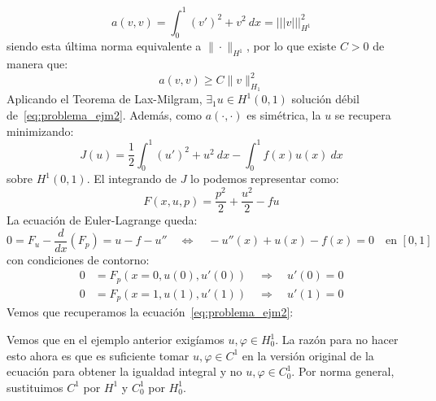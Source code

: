 \begin{ejemplo}
\begin{equation*}
        a(v,v) = \int_{0}^{1} {(v')}^{2}+v^2~dx = \lvert\!\lvert\!\lvert v\rvert\!\rvert\!\rvert_{H^1}^2
    \end{equation*}
    siendo esta última norma equivalente a $\|\cdot \|_{H^1}$, por lo que existe $C>0$ de manera que:
    \begin{equation*}
        a(v,v) \geq C\|v\|^2_{H_1}
    \end{equation*}
    Aplicando el Teorema de Lax-Milgram, $\exists_1 u\in H^1(0,1)$ solución débil de~\eqref{eq:problema_ejm2}. Además, como $a(\cdot ,\cdot )$ es simétrica, la $u$ se recupera minimizando:
    \begin{equation*}
        J(u) = \frac{1}{2}\int_{0}^{1} {(u')}^{2}+u^2~dx  - \int_{0}^{1} f(x)u(x)~dx 
    \end{equation*}
    sobre $H^1(0,1)$. El integrando de $J$ lo podemos representar como:
    \begin{equation*}
        F(x,u,p) = \frac{p^2}{2} + \frac{u^2}{2} - fu
    \end{equation*}
    La ecuación de Euler-Lagrange queda:
    \begin{equation*}
        0 = F_u - \frac{d}{dx}(F_p) = u - f - u'' \quad\Longleftrightarrow\quad -u''(x) +u(x)-f(x) = 0 \quad \text{en\ }[0,1]
    \end{equation*}
    con condiciones de contorno:
    \begin{align*}
        0 &= F_p(x=0,u(0),u'(0)) \quad\Longrightarrow\quad u'(0) = 0 \\
        0 &= F_p(x=1,u(1),u'(1)) \quad\Longrightarrow\quad u'(1) = 0
    \end{align*}
    Vemos que recuperamos la ecuación~\eqref{eq:problema_ejm2}:
\end{ejemplo}

\begin{observacion}
    Vemos que en el ejemplo anterior exigíamos $u,\varphi \in H^1_0$. La razón para no hacer esto ahora es que es suficiente tomar $u,\varphi \in C^1$ en la versión original de la ecuación para obtener la igualdad integral y no $u,\varphi \in C^1_0$. Por norma general, sustituimos $C^1$ por $H^1$ y $C_0^1$ por $H_0^1$.
\end{observacion}

